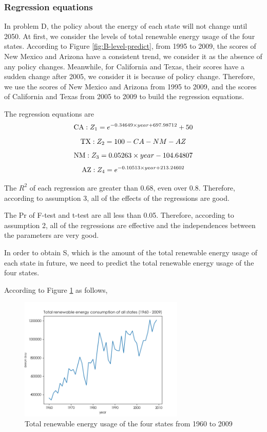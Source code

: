 \documentclass[a4paper,11pt]{article}
\begin{document}
\subsubsection{Regression equations}
\par In problem D, the policy about the energy of each state will not change until 2050. At first, we consider the levels of total renewable energy usage of the four states.  According to Figure \ref{fig:B-level-predict}, from 1995 to 2009, the scores of New Mexico and Arizona have a consistent trend, we consider it as the absence of any policy changes. Meanwhile, for California and Texas, their scores have a sudden change after 2005, we consider it is because of policy change. Therefore, we use the scores of New Mexico and Arizona from 1995 to 2009, and the scores  of California and Texas from 2005 to 2009 to build the regression equations.
\par The regression equations are
\begin{equation}
    \centering
\text{CA}:   Z_1=e^{-0.34649 \times year+697.98712}+50
\end{equation}
\begin{equation}
    \centering
\text{TX}:   Z_2=100-CA-NM-AZ
\end{equation}
\begin{equation}
    \centering
\text{NM}:   Z_3=0.05263 \times year-104.64807
\end{equation}
\begin{equation}
    \centering
\text{AZ}:   Z_4=e^{-0.10513 \times year+213.24602}
\end{equation}
\par The $R^{2}$ of each regression are greater than 0.68, even over 0.8. Therefore, according to assumption 3, all of the effects of the regressions are good.
\par The Pr of F-test and t-test are all less than 0.05. Therefore, according to assumption 2, all of the regressions are effective and the independences between the parameters are very good.
\par In order to obtain S, which is the amount of the total renewable energy usage of each state in future, we need to predict the total renewable energy usage of the four states.
\par According to Figure \ref{fig:D-total-energy} as follows,
\begin{figure}[h]%
    \centering 
    \includegraphics[width=0.7\textwidth]{./Pic/D-total-energy.png}
    \caption{Total renewable energy usage of the four states from 1960 to 2009}
    \label{fig:D-total-energy}  
\end{figure}
\end{document}

